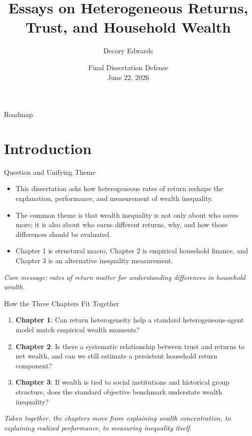 \documentclass{beamer}
\title[Dissertation Defense]{Essays on Heterogeneous Returns, Trust, and Household Wealth}
\author[Edwards]{Decory Edwards}
\institute[JHU]{Johns Hopkins University}
\date[June 22, 2026]{Final Dissertation Defense \\ June 22, 2026}
\begin{document}
\begin{frame}
  \titlepage
\end{frame}

\begin{frame}{Roadmap}
  \tableofcontents[hideallsubsections]
\end{frame}

\section{Introduction}

\begin{frame}{Question and Unifying Theme}
  \begin{itemize}
    \item This dissertation asks how heterogeneous rates of return reshape the explanation, performance, and measurement of wealth inequality.
    \item The common theme is that wealth inequality is not only about who saves more; it is also about who earns different returns, why, and how those differences should be evaluated.
    \item Chapter 1 is structural macro, Chapter 2 is empirical household finance, and Chapter 3 is an alternative inequality measurement.
  \end{itemize}

  \vspace{0.5em}
  \textit{Core message: rates of return matter for understanding differences in household wealth.}
\end{frame}

\begin{frame}{How the Three Chapters Fit Together}
  \begin{enumerate}
    \item \textbf{Chapter 1}: Can return heterogeneity help a standard heterogeneous-agent model match empirical wealth moments?
    \item \textbf{Chapter 2}: Is there a systematic relationship between trust and returns to net wealth, and can we still estimate a persistent household return component?
    \item \textbf{Chapter 3}: If wealth is tied to social institutions and historical group structure, does the standard objective benchmark understate wealth inequality?
  \end{enumerate}

  \vspace{0.6em}
  \textit{Taken together, the chapters move from explaining wealth concentration, to explaining realized performance, to measuring inequality itself.}
\end{frame}
\end{document}
